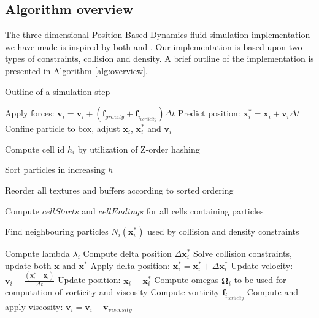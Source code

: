 \subsection{Algorithm overview}

The three dimensional Position Based Dynamics fluid simulation implementation we have made is inspired by both \cite{macklin2013position} and \cite{macklin2014unified}. Our implementation is based upon two types of constraints, collision and density. A brief outline of the implementation is presented in Algorithm \ref{alg:overview}.

\begin{algorithm}
\caption{Outline of a simulation step}
\label{alg:overview}
\begin{algorithmic}[1]
\small

\State Apply forces: $\mathbf{v}_{i} = \mathbf{v}_{i} + (\mathbf{f}_{gravity} + \mathbf{f}_{i_{vorticity}})\Delta t$
\State Predict position: $\mathbf{x}_{i}^{*}= \mathbf{x}_{i} + \mathbf{v}_{i} \Delta t$
\State Confine particle to box, adjust $\mathbf{x}_{i}$, $\mathbf{x}_{i}^{*}$ and $\mathbf{v}_{i}$ 
\EndFor


\State Compute cell id $h_{i}$ by utilization of Z-order hashing
\EndFor

\State Sort particles in increasing $h$

\State Reorder all textures and buffers according to sorted ordering

\State Compute $cellStarts$ and $cellEndings$ for all cells containing particles


\State Find neighbouring particles $N_{i}(\mathbf{x}_{i}^{*})$ used by collision and density constraints
\EndFor

\State Compute lambda $\lambda_{i}$
\EndFor
{}
\State Compute delta position $\Delta \mathbf{x}_{i}^{*}$
\EndFor
{}
\State Solve collision constraints, update both $\mathbf{x}$ and $\mathbf{x}^{*}$
\EndWhile
{}
\State Apply delta position: $\mathbf{x}_{i}^{*} = \mathbf{x}_{i}^{*} + \Delta \mathbf{x}_{i}^{*}$
\EndFor
\EndWhile
{}
\State Update velocity: $\mathbf{v}_{i} = \frac{(\mathbf{x}_{i}^{*} - \mathbf{x}_{i})}{\Delta t}$
\State Update position: $\mathbf{x}_{i} = \mathbf{x}_{i}^{*}$
\EndFor
{}
\State Compute omegas $\mathbf{\Omega}_{i}$ to be used for computation of vorticity and viscosity
\EndFor
{}
\State Compute vorticity $\mathbf{f}_{i_{vorticity}}$
\EndFor
{}
\State Compute and apply viscosity: $\mathbf{v}_{i} = \mathbf{v}_{i} + \mathbf{v}_{viscosity}$
\EndFor

\end{algorithmic}
\end{algorithm}


